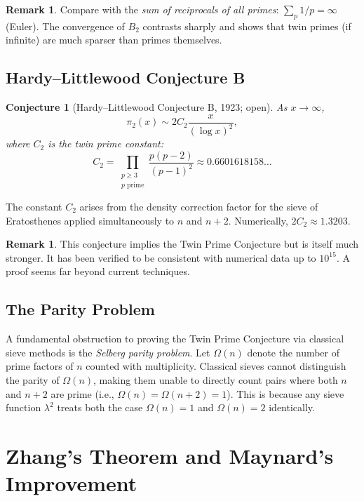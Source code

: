 \documentclass[12pt,a4paper]{amsart}
\newtheorem{conjecture}[theorem]{Conjecture}
\theoremstyle{definition}
\newtheorem{remark}[theorem]{Remark}
\begin{document}
\begin{remark}
Compare with the \emph{sum of reciprocals of all primes}:
$\sum_p 1/p = \infty$ (Euler). The convergence of $B_2$ contrasts sharply
and shows that twin primes (if infinite) are much sparser than primes themselves.
\end{remark}

\subsection{Hardy--Littlewood Conjecture B}

\begin{conjecture}[Hardy--Littlewood Conjecture B, 1923; open]
\label{conj:hl}
As $x \to \infty$,
\[
  \pi_2(x) \sim 2 C_2 \frac{x}{(\log x)^2},
\]
where $C_2$ is the \emph{twin prime constant}:
\[
  C_2 = \prod_{\substack{p \geq 3 \\ p \text{ prime}}} \frac{p(p-2)}{(p-1)^2}
       \approx 0.6601618158\ldots
\]
\end{conjecture}

The constant $C_2$ arises from the density correction factor for the sieve of
Eratosthenes applied simultaneously to $n$ and $n+2$. Numerically,
$2C_2 \approx 1.3203$.

\begin{remark}
This conjecture implies the Twin Prime Conjecture but is itself much stronger.
It has been verified to be consistent with numerical data up to $10^{15}$.
A proof seems far beyond current techniques.
\end{remark}

\subsection{The Parity Problem}

A fundamental obstruction to proving the Twin Prime Conjecture via classical
sieve methods is the \emph{Selberg parity problem}. Let $\Omega(n)$ denote the
number of prime factors of $n$ counted with multiplicity. Classical sieves
cannot distinguish the parity of $\Omega(n)$, making them unable to directly
count pairs where both $n$ and $n+2$ are prime (i.e., $\Omega(n) =
\Omega(n+2) = 1$). This is because any sieve function $\lambda^2$ treats both
the case $\Omega(n) = 1$ and $\Omega(n) = 2$ identically.

\section{Zhang's Theorem and Maynard's Improvement}
\end{document}
